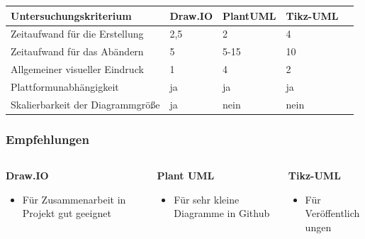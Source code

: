 \documentclass[xcolor=dvipsnames]{beamer}
\begin{document}
\begin{frame}
\begin{columns}
	\end{columns}
	\begin{table}
		\begin{tabular}{l l l l l}
			\toprule
			\textbf{Untersuchungskriterium} & \textbf{Draw.IO} & \textbf{PlantUML} & \textbf{Tikz-UML}\\
			\midrule
			Zeitaufwand für die Erstellung & 2,5 & 2 & 4 \\
			\midrule
			Zeitaufwand für das Abändern & 5 & 5-15 & 10  \\
			\midrule
			Allgemeiner visueller Eindruck & 1 & 4 & 2 \\
			\midrule
			Plattformunabhängigkeit & ja & ja & ja\\
			\midrule
			Skalierbarkeit der Diagrammgröße & ja & nein & nein\\
			\bottomrule
		\end{tabular}
	\end{table}
	
	
	
\end{frame}


\begin{frame}
	\frametitle{Empfehlungen}
	\begin{columns}
		
		
		\begin{column}{0.33\textwidth}
			\begin{block}{\textbf{Draw.IO}}
				\begin{itemize}
					\item Für Zusammenarbeit in Projekt gut geeignet
				\end{itemize}
			\end{block}
		\end{column}
		
		\begin{column}{0.4\textwidth}
			\begin{block}{\textbf{Plant UML}}
				\begin{itemize}
					\item Für sehr kleine Diagramme in Github
				\end{itemize}
			\end{block}
		\end{column}
		
		\begin{column}{0.33\textwidth}
			\begin{block}{\textbf{Tikz-UML}}
				\begin{itemize}
					\item Für Veröffentlichungen
				\end{itemize}
			\end{block}
		\end{column}
		
	\end{columns}

\end{frame}
\end{document}
